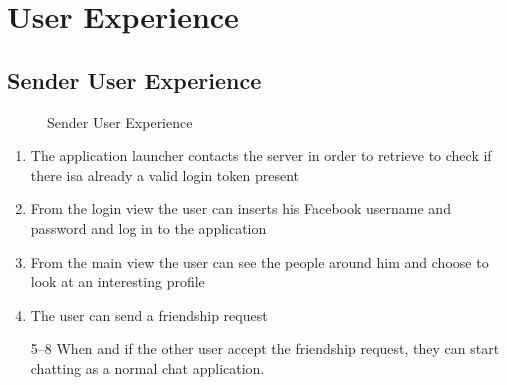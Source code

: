 \section{User Experience}

\subsection{Sender User Experience}

\begin{figure}[H]
\caption{Sender User Experience}
\end{figure}

\begin{enumerate}
\item The application launcher contacts the server in order to retrieve to check if there isa already a valid login token present

\item From the login view the user can inserts his Facebook username and password and log in to the application

\item From the main view the user can see the people around him and choose to look at an interesting profile

\item The user can send a friendship request

\item[5--8] When and if the other user accept the friendship request, they can start chatting as a normal chat application.
\end{enumerate}


